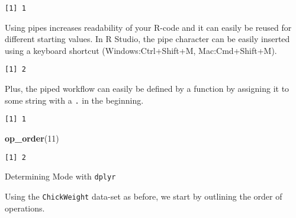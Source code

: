 \documentclass[12pt,]{article}
\newenvironment{Shaded}{\begin{snugshade}}{\end{snugshade}}
\newcommand{\KeywordTok}[1]{\textcolor[rgb]{0.13,0.29,0.53}{\textbf{#1}}}
\newcommand{\DecValTok}[1]{\textcolor[rgb]{0.00,0.00,0.81}{#1}}
\newcommand{\StringTok}[1]{\textcolor[rgb]{0.31,0.60,0.02}{#1}}
\newcommand{\OperatorTok}[1]{\textcolor[rgb]{0.81,0.36,0.00}{\textbf{#1}}}
\newcommand{\NormalTok}[1]{#1}
\theoremstyle{definition}
\theoremstyle{definition}
\theoremstyle{definition}
\theoremstyle{remark}
\begin{document}
\begin{verbatim}
[1] 1
\end{verbatim}

Using pipes increases readability of your R-code and it can easily be
reused for different starting values. In R Studio, the pipe character
can be easily inserted using a keyboard shortcut (Windows:Ctrl+Shift+M,
Mac:Cmd+Shift+M).

\begin{Shaded}
\end{Shaded}

\begin{verbatim}
[1] 2
\end{verbatim}

Plus, the piped workflow can easily be defined by a function by
assigning it to some string with a \texttt{.} in the beginning.

\begin{Shaded}
\end{Shaded}

\begin{verbatim}
[1] 1
\end{verbatim}

\begin{Shaded}
\begin{Highlighting}[]
\KeywordTok{op_order}\NormalTok{(}\DecValTok{11}\NormalTok{)}
\end{Highlighting}
\end{Shaded}

\begin{verbatim}
[1] 2
\end{verbatim}

Determining Mode with \texttt{dplyr}

Using the \texttt{ChickWeight} data-set as before, we start by outlining
the order of operations.
\end{document}
